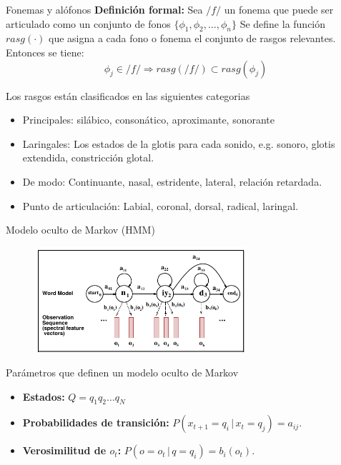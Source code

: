 \documentclass[11pt,xcolor={dvipsnames}]{beamer}
\begin{document}
\begin{frame}{Fonemas y alófonos}
\textbf{Definición formal:} Sea $/f/$ un fonema que puede ser articulado como un conjunto de fonos $\{ \phi_1, \phi_2, \ldots, \phi_n \}$
Se define la función $rasg(\cdot)$ que asigna a cada fono o fonema el conjunto de rasgos relevantes. Entonces se tiene:
$$ \phi_j \in /f/ \Rightarrow rasg(/f/) \subset rasg(\phi_j) $$

Los rasgos están clasificados en las siguientes categorias
\begin{itemize}
\item Principales: silábico, consonático, aproximante, sonorante
\item Laringales: Los estados de la glotis para cada sonido, e.g. sonoro, glotis extendida, constricción glotal.
\item De modo: Continuante, nasal, estridente, lateral, relación retardada.
\item Punto de articulación: Labial, coronal, dorsal, radical, laringal. 
\end{itemize}
\end{frame}
\begin{frame}{Modelo oculto de Markov (HMM)}
\begin{figure}
\centering
\includegraphics[width=0.7\textwidth]{hmm.png}
\end{figure}
Parámetros que definen un modelo oculto de Markov
\begin{itemize}
\item  \textbf{Estados:} $Q=q_1q_2\ldots q_N$
\item  \textbf{Probabilidades de transición:} $P(x_{t+1}=q_i\,|\,x_t=q_j)= a_{ij}.$
\item  \textbf{Verosimilitud de $o_t$:} $P(o=o_t\,|\,q=q_i) = b_i(o_t)$.
\end{itemize}
\end{frame}
\end{document}
